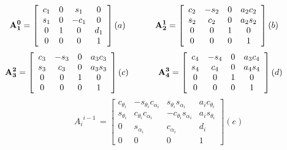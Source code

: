 \begin{equation} 
\label{eq:01}
\mathbf{A_1^0} = \left[
\begin{array}{cccc}
c_1 & 0 & s_1  & 0 \\
s_1 & 0 & -c_1 & 0 \\
0  & 1 &  0   & d_1 \\
0  & 0 &  0   & 1
\end{array} \right] (a) \hspace{0.1\textwidth} \nonumber
\mathbf{A_2^1} = \left[
\begin{array}{cccc}
c_2 & -s_2 & 0 & a_2c_2 \\
s_2 & c_2  & 0 & a_2s_2 \\
0  &  0   & 1 &   0    \\
0  &  0   & 0 &   1
\end{array} \right] (b) \hspace{0.1\textwidth} \nonumber
\end{equation}
\begin{equation}
\mathbf{A_3^2} = \left[
\begin{array}{cccc}
c_3 & -s_3 & 0 & a_3c_3 \\
s_3 & c_3  & 0 & a_3s_3 \\ 
0  &  0   & 1 &   0    \\ 
0  &  0   & 0 &   1       
\end{array} \right]  (c) \hspace{0.1\textwidth} \nonumber          
\mathbf{A_4^3} = \left[
\begin{array}{cccc}
c_4 & -s_4 & 0 & a_3c_4 \\
s_4 & c_4  & 0 & a_4s_4 \\
0  &  0   & 1 &   0    \\
0  &  0   & 0 &   1
\end{array} \right] (d) \hspace{0.1\textwidth} \nonumber
\end{equation}
\begin{equation}
\label{eq:05}
{A_i}^{i-1}\,=\left[
\begin{array}{cccc}
c_{\theta_i} & -s_{\theta_i}c_{\alpha_i}  & s_{\theta_i}s_{\alpha_i}  & a_ic_{\theta_i}\\
s_{\theta_i} & c_{\theta_i}c_{\alpha_i}  & -c_{\theta_i}s_{\alpha_i}  & a_is_{\theta_i}\\
0 & s_{\alpha_i} &c_{\alpha_i}  & d_i\\
0 & 0 & 0 & 1 
\end{array} \right](e)
\end{equation}	
